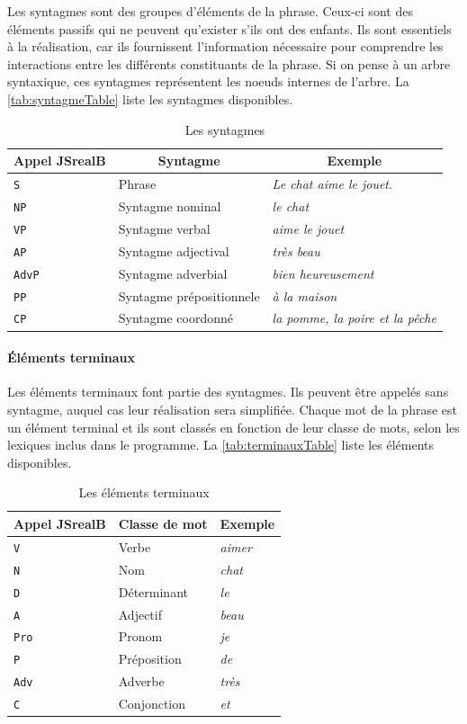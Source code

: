 \documentclass[11pt]{article} %
\newcommand{\system}[1]{\textsf{#1}}
\newcommand{\JSB}{\system{JSrealB}}
\newcommand{\real}[1]{\emph{#1}}
\begin{document}
Les syntagmes sont des groupes d'éléments de la phrase. Ceux-ci sont
des éléments passifs qui ne peuvent qu'exister s'ils ont des enfants.
Ils sont essentiels à la réalisation, car ils fournissent l'information
nécessaire pour comprendre les interactions entre les différents constituants
de la phrase. Si on pense à un arbre syntaxique, ces syntagmes représentent
les noeuds internes de l'arbre. La \autoref{tab:syntagmeTable} liste les syntagmes disponibles.
\begin{table}
\centering
\caption{Les syntagmes}
\begin{tabular}{|l|l|l|}
\hline 
\multicolumn{1}{|c}{Appel \JSB{}}  & \multicolumn{1}{|c}{Syntagme} & \multicolumn{1}{|c|}{Exemple}\tabularnewline
\hline 
\hline 
\texttt{S} & Phrase & \real{Le chat aime le jouet}.\tabularnewline
\hline 
\texttt{NP} & Syntagme nominal & \real{le chat}\tabularnewline
\hline 
\texttt{VP} & Syntagme verbal & \real{aime le jouet}\tabularnewline
\hline 
\texttt{AP} & Syntagme adjectival & \real{très beau}\tabularnewline
\hline 
\texttt{AdvP} & Syntagme adverbial & \real{bien heureusement}\tabularnewline
\hline 
\texttt{PP} & Syntagme prépositionnele & \real{à la maison}\tabularnewline
\hline 
\texttt{CP} & Syntagme coordonné & \real{la pomme, la poire et la pêche}\tabularnewline
\hline 
\end{tabular}

\label{tab:syntagmeTable}
\end{table}


\paragraph{Éléments terminaux}

Les éléments terminaux font partie des syntagmes. Ils peuvent être
appelés sans syntagme, auquel cas leur réalisation sera simplifiée.
Chaque mot de la phrase est un élément terminal et ils sont classés
en fonction de leur classe de mots, selon les lexiques inclus dans le
programme. La \autoref{tab:terminauxTable} liste les éléments disponibles.

\begin{table}
\centering
\caption{Les éléments terminaux}
\label{tab:terminauxTable}
\begin{tabular}{|l|l|l|}
\hline 
\multicolumn{1}{|c}{Appel \JSB{}}  & \multicolumn{1}{|c}{Classe de mot} & \multicolumn{1}{|c|}{Exemple}\tabularnewline
\hline 
\hline 
\texttt{V} & Verbe & \real{aimer}\tabularnewline
\hline 
\texttt{N} & Nom & \real{chat}\tabularnewline
\hline 
\texttt{D} & Déterminant & \real{le}\tabularnewline
\hline 
\texttt{A} & Adjectif & \real{beau}\tabularnewline
\hline 
\texttt{Pro} & Pronom & \real{je}\tabularnewline
\hline 
\texttt{P} & Préposition & \real{de}\tabularnewline
\hline 
\texttt{Adv} & Adverbe & \real{très}\tabularnewline
\hline 
\texttt{C} & Conjonction & \real{et}\tabularnewline
\hline 
\end{tabular}
\end{table}
\end{document}
